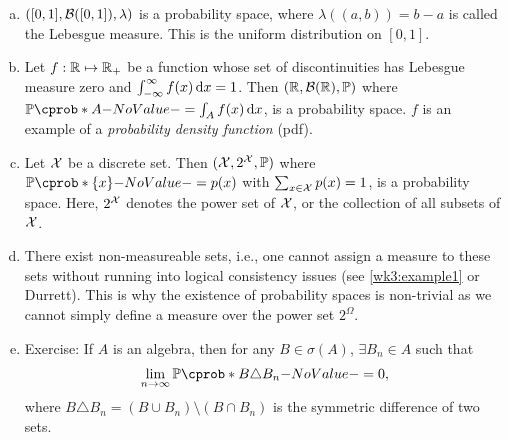 \documentclass[12pt]{article}
\begin{document}
\begin{enumerate}[(a)]
	\item $([0,1],\mathcal{B}([0,1]),\lambda)$ is a probability space, where $\lambda((a,b)) = b-a$ is called the Lebesgue measure. This is the uniform distribution on $[0,1]$.
	\item Let $f: \mathbb{R}\mapsto\mathbb{R}_+$ be a function whose set of discontinuities has Lebesgue measure zero and $\int_{-\infty}^\infty f(x) \,\mathrm{d} x=1$. Then $(\Real, \calB(\Real), \P)$ where $\P(A) = \int_A f(x) \ud x$, is a probability space. $f$ is an example of a \emph{probability density function} (pdf).
	\item Let $\mathcal{X}$ be a discrete set. Then $(\calX, 2^\calX, \P)$ where $\P(\{x\}) = p(x)$ with $\sum_{x\in\mathcal{X}} p(x) =1$, is a probability space. Here, $2^{\mathcal{X}}$ denotes the power set of $\mathcal{X}$, or the collection of all subsets of $\mathcal{X}$.
	\item There exist non-measureable sets, i.e., one cannot assign a measure to these sets without running into logical consistency issues (see \cref{wk3:example1} or Durrett). This is why the existence of probability spaces is non-trivial as we cannot simply define a measure over the power set $2^\Omega$. 
	\item Exercise: If $A$ is an algebra, then for any $B\in\sigma(A)$, $\exists B_n\in A$ such that 
	\begin{align*}
	\lim_{n\to\infty} \P(B\triangle B_n) = 0,
	\end{align*}
	where $B\triangle B_n = (B\cup B_n)\setminus(B\cap B_n)$ is the symmetric difference of two sets.
\end{enumerate}

%

\end{document}
